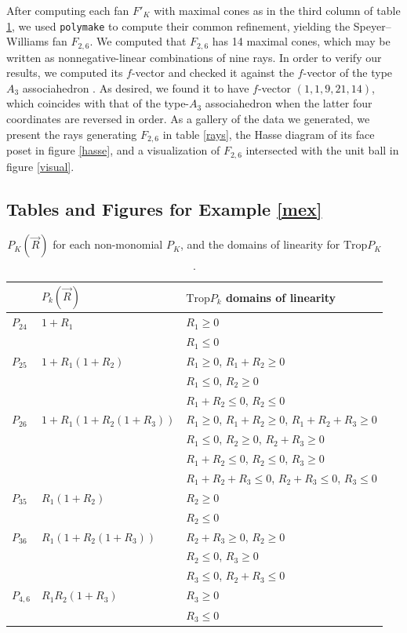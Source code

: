 \documentclass[12pt,letter]{article}
\newcommand{\trop}{\mathrm{Trop}}
\begin{document}
\begin{example}
After computing each fan $F'_K$ with maximal cones as in the third column of table \ref{eqntable}, we used \verb|polymake| \cite{polymake} to compute their common refinement, yielding the Speyer--Williams fan $F_{2,6}$. We computed that $F_{2,6}$ has 14 maximal cones, which may be written as nonnegative-linear combinations of nine rays. In order to verify our results, we computed its $f$-vector and checked it against the $f$-vector of the type $A_{3}$ associahedron \cite{Pmatrix}. As desired, we found it to have $f$-vector $(1,1,9,21,14)$, which coincides with that of the type-$A_3$ associahedron when the latter four coordinates are reversed in order. As a gallery of the data we generated, we present the rays generating $F_{2,6}$ in table \ref{rays}, the Hasse diagram of its face poset in figure \ref{hasse}, and a visualization of $F_{2,6}$ intersected with the unit ball in figure \ref{visual}\label{mex}.\end{example}\newpage\subsection{Tables and Figures for Example \ref{mex}}\begin{table}[h!]\begin{centering} \begin{tabular}{l|l|l}
			&$P_k(\vec{R})$&$\trop P_k$ domains of linearity\\\hline $P_{24}$& $1+R_1$& $R_1\geq 0$\\&&$R_1\leq 0$\\
			\hline $P_{25}$& $1+R_1(1+R_2)$&$R_1\geq 0$, $R_1+R_2\geq 0$\\&&$R_1\leq 0$, $R_2\geq 0$\\&&$R_1+R_2\leq 0$, $R_2\leq 0$\\
			\hline $P_{26}$& $1+R_1(1+R_2(1+R_3))$&$R_1\geq 0$, $R_1+R_2\geq 0$, $R_1+R_2+R_3\geq 0$\\
			&&$R_1\leq 0$, $R_2\geq 0$, $R_2+R_3\geq 0$\\
			&&$R_1+R_2\leq 0$, $R_2\leq 0$, $R_3\geq 0$\\
			&&$R_1+R_2+R_3\leq 0$, $R_2+R_3\leq 0$, $R_3\leq 0$\\
			\hline $P_{35}$&$R_1(1+R_2)$&$R_2\geq 0$\\&&$R_2\leq 0$\\
			\hline $P_{36}$&$R_1(1+R_2(1+R_3))$&$R_2+R_3\geq 0$, $R_2\geq 0$\\&&$R_2\leq 0$, $R_3\geq 0$\\&&$R_3\leq 0 $, $R_2+R_3\leq 0$\\
			\hline $P_{4,6}$& $R_1R_2(1+R_3)$&$R_3\geq 0$\\
			&&$R_3\leq 0$
			
		\end{tabular}
		\caption{\label{eqntable}$P_K(\vec{R})$ for each non-monomial $P_K$, and the domains of linearity for $\trop P_K$.}\end{centering}
\end{table}
\end{document}
